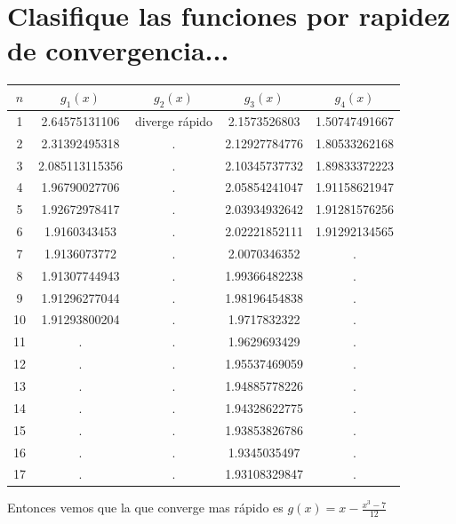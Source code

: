 \documentclass{article}
\begin{document}
\section{Clasifique las funciones por rapidez de convergencia...}
\begin{center}
    \begin{tabular}{||c c c c c||} 
    \hline
    $n$ & $g_1(x)$ & $g_2(x)$ & $g_3(x)$ & $g_4(x)$ \\ [0.5ex] 
    \hline
    1 & 2.64575131106 & diverge rápido  & 2.1573526803 & 1.50747491667 \\
    \hline 
    2 & 2.31392495318 & . & 2.12927784776 & 1.80533262168 \\
    \hline 
    3 & 2.085113115356 & . & 2.10345737732 & 1.89833372223 \\ 
    \hline 
    4 & 1.96790027706 & . & 2.05854241047 & 1.91158621947 \\
    \hline 
    5 & 1.92672978417& . & 2.03934932642 & 1.91281576256 \\
    \hline 
    6 & 1.9160343453 & . & 2.02221852111 & 1.91292134565 \\
    \hline 
    7 & 1.9136073772 & . & 2.0070346352 & . \\ 
    \hline
    8 & 1.91307744943 & . & 1.99366482238 & . \\
    \hline 
    9 & 1.91296277044 & . & 1.98196454838 & .\\
    \hline 
    10 & 1.91293800204 & . & 1.9717832322 & .\\
    \hline 
    11 & . & . & 1.9629693429 & .\\
    \hline 
    12 & . & . & 1.95537469059 & .\\
    \hline 
    13 & . & . & 1.94885778226 & .\\
    \hline 
    14 & . & . & 1.94328622775 & .\\
    \hline 
    15 & . & . & 1.93853826786 & .\\
    \hline 
    16 & . & . & 1.9345035497 & .\\
    \hline 
    17 & . & . & 1.93108329847 & .\\ [1ex]
    \hline 
   \end{tabular}
\end{center}

Entonces vemos que la que converge mas rápido es $g(x) = x- \frac{x^3 - 7}{12}$
\end{document}
